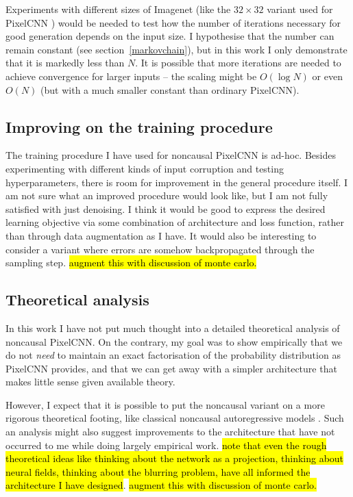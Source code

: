\documentclass[11pt, a4paper, openany]{book}
\begin{document}
Experiments with different sizes of Imagenet (like the $32\times 32$ variant used for PixelCNN \citep{pixelcnn2}) would be needed to test how the number of iterations necessary for good generation depends on the input size. I hypothesise that the number can remain constant (see section~\ref{markovchain}), but in this work I only demonstrate that it is markedly less than $N$. It is possible that more iterations are needed to achieve convergence for larger inputs -- the scaling might be $O(\log{N})$ or even $O(N)$ (but with a much smaller constant than ordinary PixelCNN).

\subsection{Improving on the training procedure}

The training procedure I have used for noncausal PixelCNN is ad-hoc. Besides experimenting with different kinds of input corruption and testing hyperparameters, there is room for improvement in the general procedure itself. I am not sure what an improved procedure would look like, but I am not fully satisfied with just denoising. I think it would be good to express the desired learning objective via some combination of architecture and loss function, rather than through data augmentation as I have. It would also be interesting to consider a variant where errors are somehow backpropagated through the sampling step. \hl{augment this with discussion of monte carlo.}

\subsection{Theoretical analysis}

In this work I have not put much thought into a detailed theoretical analysis of noncausal PixelCNN. On the contrary, my goal was to show empirically that we do not \emph{need} to maintain an exact factorisation of the probability distribution as PixelCNN provides, and that we can get away with a simpler architecture that makes little sense given available theory.

However, I expect that it is possible to put the noncausal variant on a more rigorous theoretical footing, like classical noncausal autoregressive models \citep{noncausalimage2,noncausaleco2}. Such an analysis might also suggest improvements to the architecture that have not occurred to me while doing largely empirical work. \hl{note that even the rough theoretical ideas like thinking about the network as a projection, thinking about neural fields, thinking about the blurring problem, have all informed the architecture I have designed}. \hl{augment this with discussion of monte carlo.}
\end{document}
